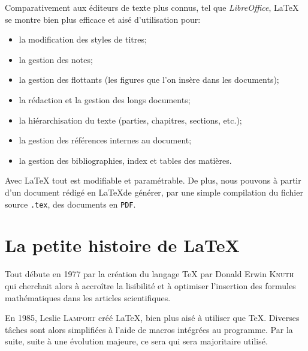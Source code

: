 Comparativement aux éditeurs de texte plus connus, tel que \textit{LibreOffice}, \LaTeX{} se montre bien plus efficace et aisé d'utilisation pour:
\begin{itemize}
\item la modification des styles de titres;
\item la gestion des notes;
\item la gestion des flottants (les figures que l'on insère dans les documents);
\item la rédaction et la gestion des longs documents;
\item la hiérarchisation du texte (parties, chapitres, sections, etc.);
\item la gestion des références internes au document;
\item la gestion des bibliographies, index et tables des matières.
\end{itemize}
\medskip

Avec \LaTeX{} tout est modifiable et paramétrable. De plus, nous pouvons à partir d'un document rédigé en \LaTeX de générer, par une simple compilation du fichier source \texttt{.tex}, des documents en \texttt{PDF}.
\medskip

\section{La petite histoire de \LaTeX}
Tout débute en 1977 par la création du langage \TeX{} par Donald Erwin \textsc{Knuth} qui cherchait alors à accroître la lisibilité et à optimiser l'insertion des formules mathématiques dans les articles scientifiques.
\medskip

En 1985, Leslie \textsc{Lamport} créé \LaTeX, bien plus aisé à utiliser que \TeX{}. Diverses tâches sont alors simplifiées à l'aide de macros intégrées au programme. Par la suite, suite à une évolution majeure, ce sera \LaTeXe{} qui sera majoritaire utilisé.
\medskip
